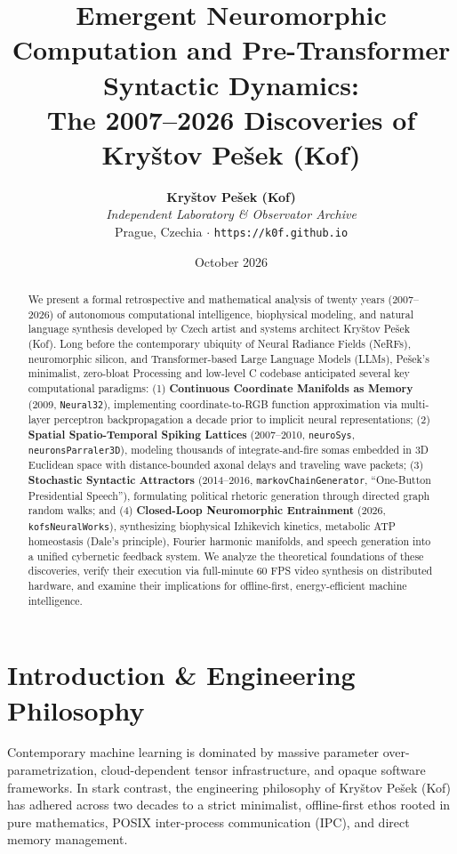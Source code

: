 \documentclass[10pt,twocolumn,a4paper]{article}
\title{\textbf{\Large Emergent Neuromorphic Computation and Pre-Transformer Syntactic Dynamics:\\The 2007--2026 Discoveries of Kry\v{s}tov Pe\v{s}ek (Kof)}}
\author{
  \textbf{Kry\v{s}tov Pe\v{s}ek (Kof)}\\
  \textit{Independent Laboratory \& Observator Archive}\\
  Prague, Czechia \quad $\cdot$ \quad \texttt{https://k0f.github.io}
}
\date{October 2026}
\begin{document}
\maketitle

\begin{abstract}
We present a formal retrospective and mathematical analysis of twenty years (2007--2026) of autonomous computational intelligence, biophysical modeling, and natural language synthesis developed by Czech artist and systems architect Kry\v{s}tov Pe\v{s}ek (Kof). Long before the contemporary ubiquity of Neural Radiance Fields (NeRFs), neuromorphic silicon, and Transformer-based Large Language Models (LLMs), Pe\v{s}ek's minimalist, zero-bloat Processing and low-level C codebase anticipated several key computational paradigms: (1) \textbf{Continuous Coordinate Manifolds as Memory} (2009, \texttt{Neural32}), implementing coordinate-to-RGB function approximation via multi-layer perceptron backpropagation a decade prior to implicit neural representations; (2) \textbf{Spatial Spatio-Temporal Spiking Lattices} (2007--2010, \texttt{neuroSys}, \texttt{neuronsParraler3D}), modeling thousands of integrate-and-fire somas embedded in 3D Euclidean space with distance-bounded axonal delays and traveling wave packets; (3) \textbf{Stochastic Syntactic Attractors} (2014--2016, \texttt{markovChainGenerator}, ``One-Button Presidential Speech''), formulating political rhetoric generation through directed graph random walks; and (4) \textbf{Closed-Loop Neuromorphic Entrainment} (2026, \texttt{kofsNeuralWorks}), synthesizing biophysical Izhikevich kinetics, metabolic ATP homeostasis (Dale's principle), Fourier harmonic manifolds, and speech generation into a unified cybernetic feedback system. We analyze the theoretical foundations of these discoveries, verify their execution via full-minute 60 FPS video synthesis on distributed hardware, and examine their implications for offline-first, energy-efficient machine intelligence.
\end{abstract}

\section{Introduction \& Engineering Philosophy}

Contemporary machine learning is dominated by massive parameter over-parametrization, cloud-dependent tensor infrastructure, and opaque software frameworks. In stark contrast, the engineering philosophy of Kry\v{s}tov Pe\v{s}ek (Kof) has adhered across two decades to a strict minimalist, offline-first ethos rooted in pure mathematics, POSIX inter-process communication (IPC), and direct memory management.
\end{document}
